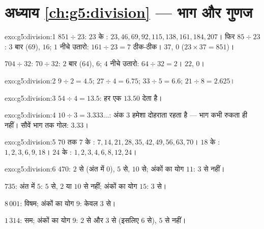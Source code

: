 \section*{अध्याय \ref{ch:g5:division} --- भाग और गुणज}

\begin{solution}{exo:g5:division:1}
$851 \div 23$: $23$ के : $23, 46, 69, 92, 115, 138, 161,
184, 207$। फिर $85 \div 23$: $3$ बार ($69$),  $16$;
$1$ नीचे उतारो: $161 \div 23 = 7$ ठीक-ठीक।  $37$,
 $0$ ($23 \times 37 = 851$)।

$704 \div 32$: $70 \div 32$: $2$ बार ($64$),  $6$; $4$
नीचे उतारो: $64 \div 32 = 2$।  $22$,  $0$।
\end{solution}

\begin{solution}{exo:g5:division:2}
$9 \div 2 = 4.5$; \quad $27 \div 4 = 6.75$; \quad
$33 \div 5 = 6.6$; \quad $21 \div 8 = 2.625$।
\end{solution}

\begin{solution}{exo:g5:division:3}
$54 \div 4 = 13.5$: हर एक $13.50$ देता है।
\end{solution}

\begin{solution}{exo:g5:division:4}
$10 \div 3 = 3.333\dots$: अंक $3$ हमेशा दोहराता रहता है ---
भाग कभी रुकता ही नहीं। सौवें भाग तक गोल: $3.33$।
\end{solution}

\begin{solution}{exo:g5:division:5}
$70$ तक $7$ के : $7, 14, 21, 28, 35, 42, 49, 56, 63,
70$। $18$ के : $1, 2, 3, 6, 9, 18$। $24$ के :
$1, 2, 3, 4, 6, 8, 12, 24$।
\end{solution}

\begin{solution}{exo:g5:division:6}
$470$: $2$ से (अंत में $0$), $5$ से, $10$ से; अंकों का योग $11$:
$3$ से नहीं।

$735$: अंत में $5$: $5$ से, $2$ या $10$ से नहीं; अंकों का योग
$15$: $3$ से।

$8\,001$: विषम; अंकों का योग $9$: केवल $3$ से।

$1\,314$: सम; अंकों का योग $9$: $2$ से और $3$ से (इसलिए $6$ से),
$5$ से नहीं।
\end{solution}

